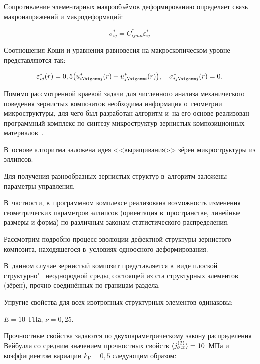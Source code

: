 Сопротивление элементарных макрообъёмов деформированию определяет связь макронапряжений и макродеформаций:

\begin{equation*}

  \sigma^*_{ij} = C^*_{ijmn} \varepsilon^*_{ij}

\end{equation*}

Соотношения Коши и уравнения равновесия на макроскопическом уровне представляются так:

\begin{equation*}

  \varepsilon^*_{ij} (r) = 0,5 \bigl(u^*_{i \bigcom j} (r) + u^*_{j \bigcom i} (r)\bigr),

\quad 

  \sigma^*_{ij \bigcom j} (r) = 0.

\end{equation*}



Помимо рассмотренной краевой задачи для численного анализа механического поведения зернистых композитов необходима информация о~геометрии микроструктуры, для чего был разработан алгоритм и~на его основе реализован программный комплекс по синтезу микроструктур зернистых композиционных материалов~\cite{Ilinykh:bib:Ilinykh}. 

В~основе алгоритма заложена идея <<выращивания>> зёрен микроструктуры из эллипсов. 

Для получения разнообразных зернистых структур в~алгоритм заложены параметры управления. 

В~частности, в~программном комплексе реализована возможность изменения геометрических параметров эллипсов (ориентация в~пространстве, линейные размеры и форма) по различным законам статистического распределения. 



Рассмотрим подробно процесс эволюции дефектной структуры зернистого композита, находящегося в~условиях одноосного деформирования. 

В~данном случае зернистый композит представляется в~виде плоской структурно"=неоднородной среды, состоящей из ста структурных элементов (зёрен), прочно соединённых по границам раздела. 

Упругие свойства для всех изотропных структурных элементов одинаковы: 

$E = 10$~ГПа, $\nu =0,25$. 

Прочностные свойства задаются по двухпараметрическому закону распределения Вейбулла со средним значением прочностных свойств $\langle j^{(2)}_{\sigma \rm cr} \rangle = 10$~МПа и коэффициентом вариации $k_{V} = 0,5$ следующим образом:

